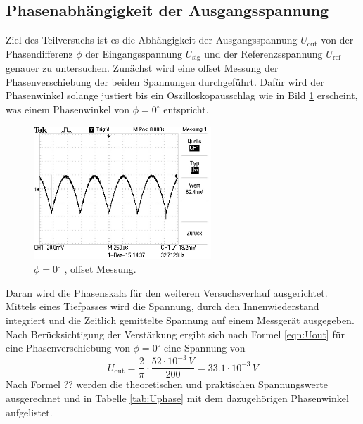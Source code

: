 \subsection{Phasenabhängigkeit der Ausgangsspannung}
Ziel des Teilversuchs ist es die Abhängigkeit der Ausgangsspannung $U_{\text{out}}$ von der Phasendifferenz $\phi$ der Eingangsspannung $U_{\text{sig}}$ und der Referenzsspannung $U_{\text{ref}}$ genauer zu untersuchen. Zunächst wird eine offset Messung der Phasenverschiebung der beiden Spannungen durchgeführt. Dafür wird der Phasenwinkel solange justiert bis ein Oszilloskopausschlag wie in Bild \ref{fig:phi0} erscheint, was einem Phasenwinkel von $\phi = 0^{\circ}$ entspricht.
\begin{figure}
  \centering
  \includegraphics[height=5cm]{picture/1.JPG}
  \caption{$\phi = 0^{\circ}$ , offset Messung.}
  \label{fig:phi0}
\end{figure}
Daran wird die Phasenskala für den weiteren Versuchsverlauf ausgerichtet. Mittels eines Tiefpasses wird die Spannung, durch den Innenwiederstand integriert und die Zeitlich gemittelte Spannung auf einem Messgerät ausgegeben. Nach Berücksichtigung der Verstärkung ergibt sich nach Formel \ref{eqn:Uout} für eine Phasenverschiebung von $\phi = 0^{\circ}$ eine Spannung von
\begin{equation}
  U_{\text{out}} = \frac{2}{\pi} \cdot \frac{52 \cdot 10^{-3} \, V}{200} = 33.1 \cdot 10^{-3} \, V
  \label{eqn:Uout}
\end{equation}
Nach Formel ?? werden die theoretischen und praktischen Spannungswerte ausgerechnet und in Tabelle \ref{tab:Uphase} mit dem dazugehörigen Phasenwinkel aufgelistet.
